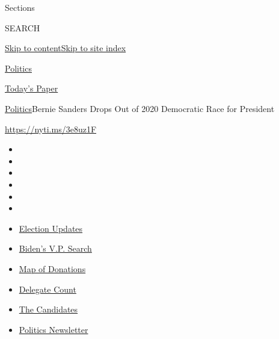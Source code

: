Sections

SEARCH

\protect\hyperlink{site-content}{Skip to
content}\protect\hyperlink{site-index}{Skip to site index}

\href{https://www.nytimes.com/section/politics}{Politics}

\href{https://myaccount.nytimes.com/auth/login?response_type=cookie\&client_id=vi}{}

\href{https://www.nytimes.com/section/todayspaper}{Today's Paper}

\href{/section/politics}{Politics}\textbar{}Bernie Sanders Drops Out of
2020 Democratic Race for President

\url{https://nyti.ms/3e8uz1F}

\begin{itemize}
\item
\item
\item
\item
\item
\item
\end{itemize}

\begin{itemize}
\item
  \href{https://www.nytimes.com/2020/07/31/us/elections/biden-vs-trump.html?action=click\&pgtype=Article\&state=default\&region=TOP_BANNER\&context=storylines_menu}{Election
  Updates}
\item
  \href{https://www.nytimes.com/article/biden-vice-president-2020.html?action=click\&pgtype=Article\&state=default\&region=TOP_BANNER\&context=storylines_menu}{Biden's
  V.P. Search}
\item
  \href{https://www.nytimes.com/interactive/2020/07/24/us/politics/trump-biden-campaign-donors.html?action=click\&pgtype=Article\&state=default\&region=TOP_BANNER\&context=storylines_menu}{Map
  of Donations}
\item
  \href{https://www.nytimes.com/interactive/2020/us/elections/delegate-count-primary-results.html?action=click\&pgtype=Article\&state=default\&region=TOP_BANNER\&context=storylines_menu}{Delegate
  Count}
\item
  \href{https://www.nytimes.com/interactive/2019/us/politics/2020-presidential-candidates.html?action=click\&pgtype=Article\&state=default\&region=TOP_BANNER\&context=storylines_menu}{The
  Candidates}
\item
  \href{https://www.nytimes.com/newsletters/politics?action=click\&pgtype=Article\&state=default\&region=TOP_BANNER\&context=storylines_menu}{Politics
  Newsletter}
\end{itemize}

